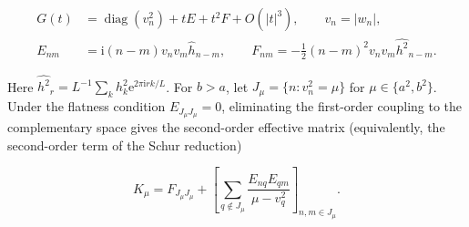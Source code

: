 \documentclass[10pt,twoside,final]{siamart1116}
\numberwithin{equation}{section}
\numberwithin{theorem}{section}
\newcommand{\diag}{\operatorname{diag}}
\newcommand{\e}{\mathrm e}
\newcommand{\ii}{\mathrm i}
\begin{document}
\begin{equation}\label{eq:gram-second}
\begin{split}
G(t)&=\diag(v_n^2)+tE+t^2F+O(|t|^3),\qquad v_n=|w_n|,\\
E_{nm}&=\ii(n-m)v_nv_m\widehat h_{n-m},\qquad
F_{nm}=-\tfrac12(n-m)^2v_nv_m\widehat{h^2}_{n-m}.
\end{split}
\end{equation}

Here $\widehat{h^2}_r=L^{-1}\sum_k h_k^2\e^{2\pi\ii rk/L}$.
For $b>a$, let $J_\mu=\{n:v_n^2=\mu\}$ for $\mu\in\{a^2,b^2\}$.
Under the flatness condition $E_{J_\mu J_\mu}=0$, eliminating the first-order
coupling to the complementary space gives the second-order effective matrix
(equivalently, the second-order term of the Schur reduction)

\begin{equation}\label{eq:effective-second}
K_\mu=F_{J_\mu J_\mu}+
\left[\sum_{q\notin J_\mu}\frac{E_{nq}E_{qm}}{\mu-v_q^2}\right]_{n,m\in J_\mu}.
\end{equation}
\end{document}
